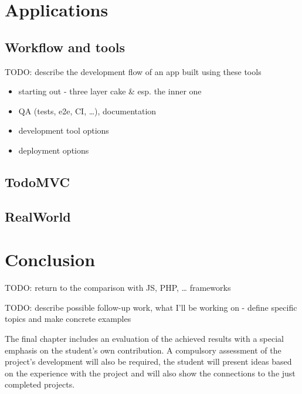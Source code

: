 \documentclass[english,odsaz]{fitthesis}
\begin{document}
\chapter{Applications}
\label{sec:org2d042a0}
\section{Workflow and tools}
\label{sec:org333237e}
TODO: describe the development flow of an app built using these tools

\begin{itemize}
\item starting out - three layer cake \& esp. the inner one
\item QA (tests, e2e, CI, \ldots{}), documentation
\item development tool options
\item deployment options
\end{itemize}

\section{TodoMVC}
\label{sec:org1e4d0b5}

\section{RealWorld}
\label{sec:org040d0fb}

\chapter{Conclusion}
\label{sec:org3589e86}
TODO: return to the comparison with JS, PHP, \ldots{} frameworks

TODO: describe possible follow-up work, what I'll be working on - define
  specific topics and make concrete examples

The final chapter includes an evaluation of the achieved results with a special
emphasis on the student's own contribution. A compulsory assessment of the
project's development will also be required, the student will present ideas
based on the experience with the project and will also show the connections to
the just completed projects. \cite{Pravidla}

\makeatletter
\def\@openbib@code{\addcontentsline{toc}{chapter}{Bibliography}}
\makeatother

\end{document}
